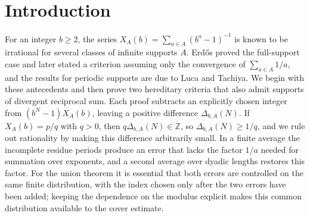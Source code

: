 \maketitle

\paperprovenance

\begin{abstract}
We prove that $\sum_{a\in A}(b^a-1)^{-1}$ is irrational for every
integer $b\ge2$ and every infinite $A\subseteq E\cup V$, whenever the
set $E$ satisfies a finite-prime weighted summability condition at base
two and $V$ admits a summable positive divisor cover. Since the
estimates for the two sets hold on one finite distribution, the union
criterion reaches supports that lie in neither individual class. We
also develop the arithmetic of finite denominators, the geometry of the
achievement set and integer-quotient tests for $1/2$ and $1/21$, keeping
each conditional argument with its hypotheses, each computation with
its finite range and each counterexample with the estimate it refutes.
Whether $1/2$ and $1/21$ are subseries sums, and the unrestricted
base-two problem, remain open.
\end{abstract}

\section*{Introduction}
For an integer $b\ge2$, the series $X_A(b)=\sum_{a\in A}(b^a-1)^{-1}$
is known to be irrational for several classes of infinite supports $A$.
Erd\H{o}s proved the full-support case and later stated a criterion
assuming only the convergence of $\sum_{a\in A}1/a$, and the results
for periodic supports are due to Luca and Tachiya. We begin with these
antecedents and then prove two hereditary criteria that also admit
supports of divergent reciprocal sum. Each proof subtracts an
explicitly chosen integer from $(b^N-1)X_A(b)$, leaving a positive
difference $\Delta_{b,A}(N)$. If $X_A(b)=p/q$ with $q>0$, then
$q\Delta_{b,A}(N)\in\mathbb Z$, so $\Delta_{b,A}(N)\ge1/q$, and we rule
out rationality by making this difference arbitrarily small. In a
finite average the incomplete residue periods produce an error that
lacks the factor $1/a$ needed for summation over exponents, and a
second average over dyadic lengths restores this factor. For the union
theorem it is essential that both errors are controlled on the same
finite distribution, with the index chosen only after the two errors
have been added; keeping the dependence on the modulus explicit makes
this common distribution available to the cover estimate.


